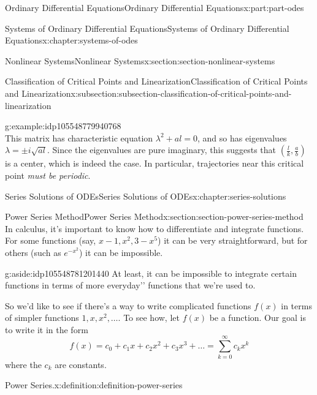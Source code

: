 \documentclass[oneside,10pt,]{book}
\numberwithin{equation}{part}
\begin{document}
\begin{partptx}{Ordinary Differential Equations}{}{Ordinary Differential Equations}{}{}{x:part:part-odes}
\begin{chapterptx}{Systems of Ordinary Differential Equations}{}{Systems of Ordinary Differential Equations}{}{}{x:chapter:systems-of-odes}
\begin{sectionptx}{Nonlinear Systems}{}{Nonlinear Systems}{}{}{x:section:section-nonlinear-systems}
\begin{subsectionptx}{Classification of Critical Points and Linearization}{}{Classification of Critical Points and Linearization}{}{}{x:subsection:subsection-classification-of-critical-points-and-linearization}
\begin{example}{}{g:example:idp105548779940768}
\begin{equation*}
\end{equation*}
This matrix has characteristic equation \(\lambda^{2} + al = 0\), and so has eigenvalues \(\lambda=\pm i\sqrt{al}\). Since the eigenvalues are pure imaginary, this suggests that \((\frac{l}{k},\frac{a}{b})\) is a center, which is indeed the case. In particular, trajectories near this critical point \emph{must be periodic}.%
\end{example}
\end{subsectionptx}
\end{sectionptx}
\end{chapterptx}
%
\typeout{************************************************}
\typeout{************************************************}
%
\begin{chapterptx}{Series Solutions of ODEs}{}{Series Solutions of ODEs}{}{}{x:chapter:series-solutions}
%
%
\typeout{************************************************}
\typeout{************************************************}
%
\begin{sectionptx}{Power Series Method}{}{Power Series Method}{}{}{x:section:section-power-series-method}
In calculus, it's important to know how to differentiate and integrate functions. For some functions (say, \(x-1,x^{2},3-x^{5}\)) it can be very straightforward, but for others (such as \(e^{-x^{2}}\)) it can be impossible. \begin{aside}{}{g:aside:idp105548781201440}%
At least, it can be impossible to integrate certain functions in terms of more \textasciigrave{}\textasciigrave{}everyday'{}'{} functions that we're used to.%
\end{aside}
%
\par
So we'd like to see if there's a way to write complicated functions \(f(x)\) in terms of simpler functions \(1,x,x^{2},\dots\). To see how, let \(f(x)\) be a function. Our goal is to write it in the form%
\begin{equation}
f(x) = c_{0}+c_{1}x+c_{2}x^{2}+c_{3}x^{3}+\dots = \sum_{k=0}^{\infty}c_{k}x^{k}\label{x:men:equation-power-series-at-zero}
\end{equation}
where the \(c_{k}\) are constants.%
\begin{definition}{Power Series.}{x:definition:definition-power-series}%

\end{definition}
\end{sectionptx}
\end{chapterptx}
\end{partptx}
\end{document}
